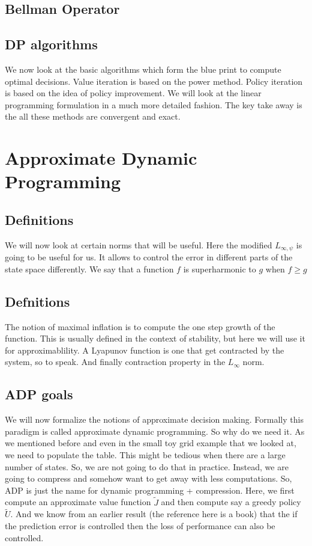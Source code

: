 \documentclass{article}
\begin{document}
\subsection{Bellman Operator}
\subsection{DP algorithms}
We now look at the basic algorithms which form the blue print to compute optimal decisions. Value iteration is based on the power method. Policy iteration is based on the idea of policy improvement. We will look at the linear programming formulation in a much more detailed fashion.
The key take away is the all these methods are convergent and exact.

\section{Approximate Dynamic Programming}
\subsection{Definitions}
We will now look at certain norms that will be useful.
Here the modified $L_{\infty,\psi}$ is going to be useful for us. It allows to control the error in different parts of the state space differently.
We say that a function $f$ is superharmonic to $g$ when $f\geq g$
\subsection{Defnitions}
The notion of maximal inflation is to compute the one step growth of the function. This is usually defined in the context of stability, but here we will use it for approximablility.
A Lyapunov function is one that get contracted by the system, so to speak. And finally contraction property in the $L_\infty$ norm.
\subsection{ADP goals}
We will now formalize the notions of approximate decision making. Formally this paradigm is called approximate dynamic programming. So why do we need it. As we mentioned before and even in the small toy grid example that we looked at, we need to populate the table. This might be tedious when there are a large number of states. So, we are not going to do that in practice. Instead, we are going to compress and somehow want to get away with less computations. So, ADP is just the name for dynamic programming + compression. Here, we first compute an approximate value function $\tilde{J}$ and then compute say a greedy policy $\tilde{U}$. And we know from an earlier result (the reference here is a book) that the if the prediction error is controlled then the loss of performance can also be controlled.
\end{document}
